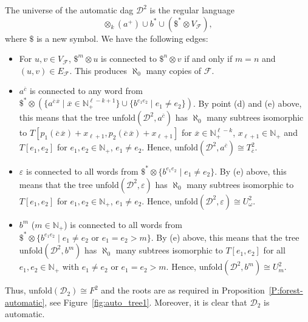 \documentclass[envcountsame]{llncs}
\newcommand{\unfold}{\mathrm{unfold}}
\newcommand{\N}{\mathbb N}
\begin{document}
The universe of the automatic dag $\mathcal D^2$ is the 
regular language 
$$
\otimes_k(a^+) \cup b^* \cup (\$^* \otimes V_{\mathcal F}),
$$
where $\$$ is a new symbol.
We have the following edges:
\begin{itemize}
\item For $u,v \in V_{\mathcal F}$, $\$^m \otimes u$ is connected to $\$^n
  \otimes v$ if and only if $m=n$ and $(u,v) \in E_{\mathcal F}$.
  This produces $\aleph_0$ many copies of $\mathcal{F}$.

\item $a^{\overline c}$ is connected to any word from $\$^* \otimes (\{ a^{\overline c\, \overline x} \mid \overline x \in
 \N_+^{\ell-k+1} \} \cup \{b^{e_1 e_2} \mid e_1 \neq e_2 \})$. By point (d) and (e) above, this means that
 the tree $\unfold(\mathcal D^2, a^{\overline c})$ has $\aleph_0$ many subtrees isomorphic to
 $T[p_1(\overline c \, \overline x)+x_{\ell+1},
    p_2(\overline c\, \overline x)+x_{\ell+1}]$ for $\overline x \in \N_+^{\ell-k}$, $x_{\ell+1}
    \in \N_+$ and $T[e_1,e_2]$ for $e_1,e_2 \in \N_+$, $e_1 \neq e_2$. 
 Hence, $\unfold(\mathcal D^2, a^{\overline c}) \cong T^2_{\overline{c}}$.

\item $\varepsilon$ is connected to all words from $\$^* \otimes \{b^{e_1 e_2} \mid e_1 \neq e_2 \}$. By (e) above, 
this means that the tree $\unfold(\mathcal D^2, \varepsilon)$ has $\aleph_0$ many subtrees 
isomorphic to $T[e_1,e_2]$ for $e_1,e_2 \in \N_+$, $e_1 \neq e_2$. Hence, $\unfold(\mathcal D^2, \varepsilon) \cong U^2_\omega$.

\item $b^m$ ($m \in \N_+$) is connected to all words from 
 $\$^* \otimes \{b^{e_1 e_2} \mid e_1 \neq e_2 \text { or } e_1=e_2 > m \}$. By (e) above,
 this means that the tree $\unfold(\mathcal D^2, b^m)$ has $\aleph_0$ many subtrees isomorphic to
 $T[e_1,e_2]$ for all $e_1,e_2 \in \N_+$ with $e_1 \neq e_2$ or 
 $e_1=e_2 > m$. Hence, $\unfold(\mathcal D^2, b^m) \cong U^2_m$.
\end{itemize}
Thus, $\unfold(\mathcal{D}_2) \cong F^2$ and the roots are as 
required in Proposition~\ref{P:forest-automatic}, see Figure~\ref{fig:auto_tree1}.
Moreover, it is clear that $\mathcal{D}_2$ is automatic.
\end{document}
